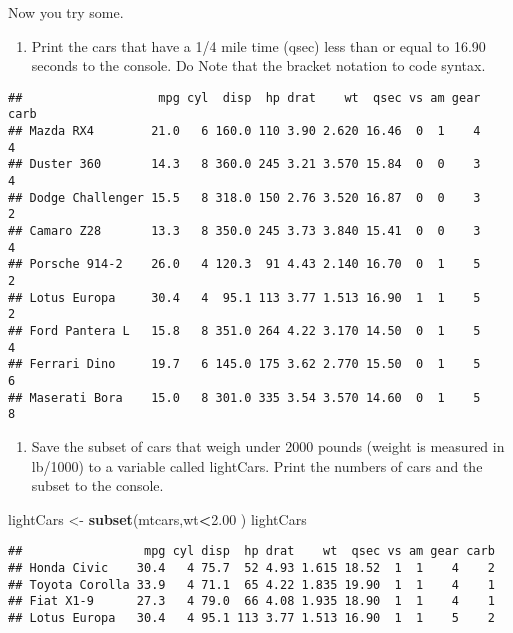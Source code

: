 \documentclass[]{article}
\newenvironment{Shaded}{\begin{snugshade}}{\end{snugshade}}
\newcommand{\KeywordTok}[1]{\textcolor[rgb]{0.13,0.29,0.53}{\textbf{#1}}}
\newcommand{\FloatTok}[1]{\textcolor[rgb]{0.00,0.00,0.81}{#1}}
\newcommand{\StringTok}[1]{\textcolor[rgb]{0.31,0.60,0.02}{#1}}
\newcommand{\OperatorTok}[1]{\textcolor[rgb]{0.81,0.36,0.00}{\textbf{#1}}}
\newcommand{\NormalTok}[1]{#1}
\providecommand{\tightlist}{%
  \setlength{\itemsep}{0pt}\setlength{\parskip}{0pt}}
\begin{document}
Now you try some.

\begin{enumerate}
\def\labelenumi{\arabic{enumi}.}
\setcounter{enumi}{5}
\tightlist
\item
  Print the cars that have a 1/4 mile time (qsec) less than or equal to
  16.90 seconds to the console. Do Note that the bracket notation to
  code syntax.
\end{enumerate}

\begin{Shaded}
\end{Shaded}

\begin{verbatim}
##                   mpg cyl  disp  hp drat    wt  qsec vs am gear carb
## Mazda RX4        21.0   6 160.0 110 3.90 2.620 16.46  0  1    4    4
## Duster 360       14.3   8 360.0 245 3.21 3.570 15.84  0  0    3    4
## Dodge Challenger 15.5   8 318.0 150 2.76 3.520 16.87  0  0    3    2
## Camaro Z28       13.3   8 350.0 245 3.73 3.840 15.41  0  0    3    4
## Porsche 914-2    26.0   4 120.3  91 4.43 2.140 16.70  0  1    5    2
## Lotus Europa     30.4   4  95.1 113 3.77 1.513 16.90  1  1    5    2
## Ford Pantera L   15.8   8 351.0 264 4.22 3.170 14.50  0  1    5    4
## Ferrari Dino     19.7   6 145.0 175 3.62 2.770 15.50  0  1    5    6
## Maserati Bora    15.0   8 301.0 335 3.54 3.570 14.60  0  1    5    8
\end{verbatim}

\begin{enumerate}
\def\labelenumi{\arabic{enumi}.}
\setcounter{enumi}{6}
\tightlist
\item
  Save the subset of cars that weigh under 2000 pounds (weight is
  measured in lb/1000) to a variable called lightCars. Print the numbers
  of cars and the subset to the console.
\end{enumerate}

\begin{Shaded}
\begin{Highlighting}[]
\NormalTok{lightCars <-}\StringTok{ }\KeywordTok{subset}\NormalTok{(mtcars,wt}\OperatorTok{<}\FloatTok{2.00}\NormalTok{ )}
\NormalTok{lightCars}
\end{Highlighting}
\end{Shaded}

\begin{verbatim}
##                 mpg cyl disp  hp drat    wt  qsec vs am gear carb
## Honda Civic    30.4   4 75.7  52 4.93 1.615 18.52  1  1    4    2
## Toyota Corolla 33.9   4 71.1  65 4.22 1.835 19.90  1  1    4    1
## Fiat X1-9      27.3   4 79.0  66 4.08 1.935 18.90  1  1    4    1
## Lotus Europa   30.4   4 95.1 113 3.77 1.513 16.90  1  1    5    2
\end{verbatim}
\end{document}
